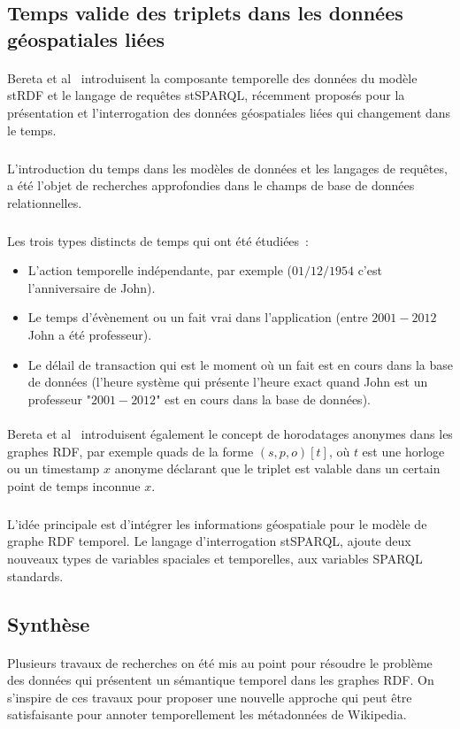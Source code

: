 \subsection*{Temps valide des triplets dans les données géospatiales liées}
\paragraph{}
Bereta et al~\cite{bereta2013} introduisent la composante temporelle des données du modèle stRDF et le langage de requêtes stSPARQL, récemment proposés pour la présentation et l’interrogation des données géospatiales liées qui changement dans le temps.
\subparagraph{}
L’introduction du temps dans les modèles de données et les langages de requêtes, a été l’objet de recherches approfondies dans le champs de base de données relationnelles.
\subparagraph{}
Les trois types distincts de temps qui ont été  étudiées~:
\begin{itemize}
\item L'action temporelle indépendante, par exemple ($01/12/1954$ c’est l’anniversaire de John).
\item Le temps d’évènement ou un fait vrai dans l’application (entre $2001-2012$ John a été professeur).
\item Le délail de transaction qui est le moment où un fait est en cours dans la base de données (l’heure système qui présente l’heure exact quand John est un professeur "$2001-2012$" est en cours dans la base de données).
\end{itemize}
\paragraph{}
Bereta et al~\cite{bereta2013} introduisent également le concept de horodatages anonymes dans les graphes RDF, par exemple quads de la forme $(s, p, o)[t]$, où $t$ est une horloge ou un timestamp $x$ anonyme déclarant que le triplet est valable dans un certain point de temps inconnue $x$.
\subparagraph{}
L’idée principale est d’intégrer les informations géospatiale pour le modèle de graphe RDF temporel. Le langage d’interrogation stSPARQL, ajoute deux nouveaux types de variables spaciales et temporelles, aux variables SPARQL standards.
\subsection*{Synthèse}
\paragraph{}
Plusieurs travaux de recherches on été mis au point pour résoudre le problème des données qui présentent un sémantique temporel dans les graphes RDF. On s'inspire de ces travaux pour proposer une nouvelle approche qui peut être satisfaisante pour annoter temporellement les métadonnées de Wikipedia.
